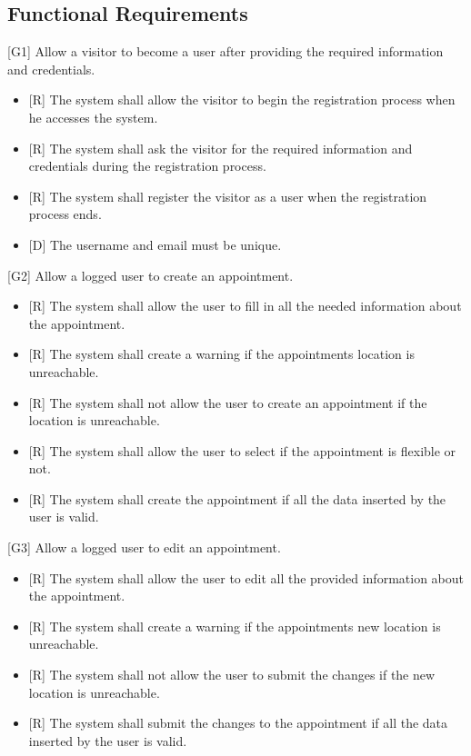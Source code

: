 \documentclass[12pt]{article}
\begin{document}
\subsection{Functional Requirements}

{[G1]} Allow a visitor to become a user after providing the required information and credentials.
\begin{itemize}
    \item{[R]} The system shall allow the visitor to begin the registration process when he accesses the system. 
    \item{[R]} The system shall ask the visitor for the required information and credentials during the registration process.
    \item{[R]} The system shall register the visitor as a user when the registration process ends.
    \item {[D]} The username and email must be unique.
\end{itemize}
{[G2]} Allow a logged user to create an appointment.
\begin{itemize}
    \item{[R]} The system shall allow the user to fill in all the needed information about the appointment.
    \item{[R]} The system shall create a warning if the appointments location is unreachable.
    \item{[R]} The system shall not allow the user to create an appointment if the location is unreachable.
    \item{[R]} The system shall allow the user to select if the appointment is flexible or not.
    \item{[R]} The system shall create the appointment if all the data inserted by the user is valid.
\end{itemize}
{[G3]} Allow a logged user to edit an appointment.
\begin{itemize}
    \item{[R]} The system shall allow the user to edit all the provided information about the appointment.
    \item{[R]} The system shall create a warning if the appointments new location is unreachable.
    \item{[R]} The system shall not allow the user to submit the changes if the new location is unreachable.
    \item{[R]} The system shall submit the changes to the appointment if all the data inserted by the user is valid.
\end{itemize}
\end{document}
